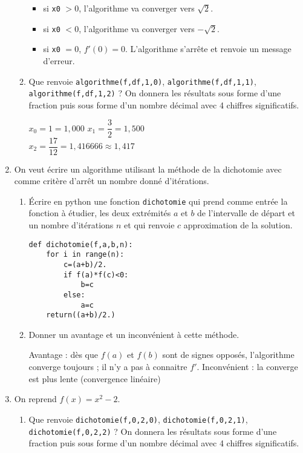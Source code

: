 \documentclass[a4paper,12pt]{article}
\begin{document}
\begin{enumerate}
\begin{enumerate}
\begin{solution}
\begin{itemize}
\item si \verb?x0? $> 0$, l'algorithme va converger vers $\sqrt{2}$.
\item si \verb?x0? $<0$, l'algorithme va converger vers $-\sqrt{2}$.
\item si \verb?x0? $=0$, $f'(0)=0$. L'algorithme s'arrête et renvoie un message d'erreur.
\end{itemize}
\end{solution}
\item Que renvoie \verb?algorithme(f,df,1,0)?, \verb?algorithme(f,df,1,1)?, \verb?algorithme(f,df,1,2)? ? On donnera les résultats sous forme d'une fraction puis sous forme d'un nombre décimal avec 4 chiffres significatifs.
\begin{solution}
$x_0=1=1,000$
$x_1=\dfrac{3}{2}=1,500$\\
$x_2=\dfrac{17}{12}=1,416666\approx 1,417$
\end{solution}
\end{enumerate}
\item On veut écrire un algorithme utilisant la méthode de la dichotomie avec comme critère d'arrêt un nombre donné d'itérations.
\begin{enumerate}
\item Écrire en python une fonction \verb?dichotomie? qui prend comme entrée la fonction à étudier, les deux extrémités $a$ et $b$ de l'intervalle de départ et un nombre d'itérations $n$ et qui renvoie $c$ approximation de la solution.
\begin{solution}
\begin{verbatim}
def dichotomie(f,a,b,n):
	for i in range(n):
		c=(a+b)/2.
		if f(a)*f(c)<0:
			b=c
		else:
			a=c
	return((a+b)/2.)				
\end{verbatim}
\end{solution}
\item Donner un avantage et un inconvénient à cette méthode.
\begin{solution}
Avantage : dès que $f(a)$ et $f(b)$ sont de signes opposés, l'algorithme converge toujours ; il n'y a pas à connaitre $f'$.
Inconvénient : la converge est plus lente (convergence linéaire)
\end{solution}
\end{enumerate}
\item On reprend $f(x)=x^2-2$.
\begin{enumerate}
\item Que renvoie \verb?dichotomie(f,0,2,0)?, \verb?dichotomie(f,0,2,1)?, \verb?dichotomie(f,0,2,2)? ? On donnera les résultats sous forme d'une fraction puis sous forme d'un nombre décimal avec 4 chiffres significatifs.

\end{enumerate}
\end{enumerate}
\end{document}
